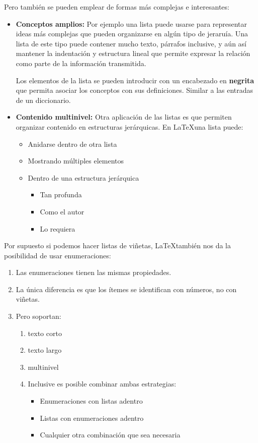 \documentclass[10pt]{report}
\begin{document}
Pero también se pueden emplear de formas más complejas e interesantes:

\begin{itemize}
    \item \textbf{Conceptos amplios:} Por ejemplo una lista puede usarse para representar ideas más complejas que pueden organizarse en algún tipo de jeraruía. 
    Una lista de este tipo puede contener mucho texto, párrafos inclusive, y aún así mantener la indentación y estructura lineal que permite expresar la relación como parte de la información transmitida.
    
    Los elementos de la lista se pueden introducir con un encabezado en \textbf{negrita} que permita asociar los conceptos con sus definiciones. Similar a las entradas de un diccionario.
    
    \item \textbf{Contenido multinivel:} Otra aplicación de las listas es que permiten organizar contenido en estructuras jerárquicas. En \LaTeX una lista puede:
    
    \begin{itemize}
        \item Anidarse dentro de otra lista
        \item Mostrando múltiples elementos
        \item Dentro de una estructura jerárquica
        \begin{itemize}
            \item Tan profunda
            \item Como el autor
            \item Lo requiera
        \end{itemize}
    \end{itemize}
\end{itemize}

Por supuesto si podemos hacer listas de viñetas, \LaTeX también nos da la posibilidad de usar enumeraciones:

\begin{enumerate}
    \item Las enumeraciones tienen las mismas propiedades.
    \item La única diferencia es que los ítemes se identifican con números, no con viñetas.
    \item Pero soportan:
    \begin{enumerate}
        \item texto corto
        \item texto largo
        \item multinivel
        \item Inclusive es posible combinar ambas estrategias:
        \begin{itemize}
            \item Enumeraciones con listas adentro
            \item Listas con enumeraciones adentro
            \item Cualquier otra combinación que sea necesaria
            
        \end{itemize}
    \end{enumerate}
\end{enumerate}
\end{document}
